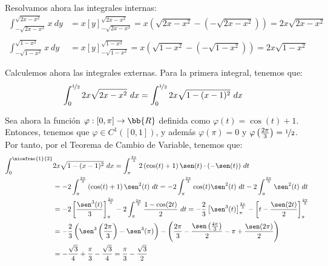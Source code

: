 \begin{ejercicio}
\begin{enumerate}
        Resolvamos ahora las integrales internas:
        \begin{align*}
            \int_{-\sqrt{2x-x^2}}^{\sqrt{2x-x^2}} x~dy
            &= x\left[ y \right]_{-\sqrt{2x-x^2}}^{\sqrt{2x-x^2}} = x\left( \sqrt{2x-x^2} - (-\sqrt{2x-x^2}) \right) = 2x\sqrt{2x-x^2} \\ \\
            \int_{-\sqrt{1-x^2}}^{\sqrt{1-x^2}} x~dy
            &= x\left[ y \right]_{-\sqrt{1-x^2}}^{\sqrt{1-x^2}} = x\left( \sqrt{1-x^2} - (-\sqrt{1-x^2}) \right) = 2x\sqrt{1-x^2}
        \end{align*}

        Calculemos ahora las integrales externas. Para la primera integral, tenemos que:
        \begin{align*}
            \int_{0}^{\nicefrac{1}{2}} 2x\sqrt{2x-x^2}~dx
            &= \int_{0}^{\nicefrac{1}{2}} 2x\sqrt{1-(x-1)^2}~dx
        \end{align*}
        
        Sea ahora la función $\varphi:[0, \pi]\to\bb{R}$ definida como $\varphi(t)=\cos(t)+1$. Entonces, tenemos que $\varphi\in C^1([0,1])$,
        y además $\varphi(\pi) = 0$ y $\varphi\left(\frac{2\pi}{3}\right) = \nicefrac{1}{2}$.
        Por tanto, por el Teorema de Cambio de Variable, tenemos que:
        \begin{align*}
            \int_{0}^{\nicefrac{1}{2}} &2x\sqrt{1-(x-1)^2}~dx
            = \int_{\pi}^{\frac{2\pi}{3}} 2\left(\cos(t)+1\right)\sen(t)\cdot (-\sen(t))~dt \\
            &= -2\int_{\pi}^{\frac{2\pi}{3}} \left(\cos(t)+1\right)\sen^2(t)~dt
            = -2\int_{\pi}^{\frac{2\pi}{3}} \cos(t)\sen^2(t)~dt - 2\int_{\pi}^{\frac{2\pi}{3}} \sen^2(t)~dt \\
            &= -2\left[\dfrac{\sen^3(t)}{3}\right]_{\pi}^{\frac{2\pi}{3}} - 2\int_{\pi}^{\frac{2\pi}{3}} \dfrac{1-\cos(2t)}{2}~dt
            = -\frac{2}{3}\left[\sen^3(t)\right]_{\pi}^{\frac{2\pi}{3}} - \left[t-\dfrac{\sen(2t)}{2}\right]_{\pi}^{\frac{2\pi}{3}} \\
            &= -\frac{2}{3}\left(\sen^3\left(\frac{2\pi}{3}\right)-\sen^3(\pi)\right) - \left(\frac{2\pi}{3}-\frac{\sen\left(\frac{4\pi}{3}\right)}{2}-\pi+\frac{\sen(2\pi)}{2}\right) \\
            &= -\frac{\sqrt{3}}{4} +\frac{\pi}{3}-\frac{\sqrt{3}}{4} = \frac{\pi}{3}-\frac{\sqrt{3}}{2}
        \end{align*}


\end{enumerate}
\end{ejercicio}

